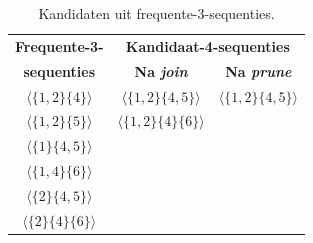\begin{table}
\centering
\caption{Kandidaten uit frequente-3-sequenties.}
\label{tabel:candidates-3-sequences}
\begin{tabular}{c|c|c}
\textbf{Frequente-3-}& \multicolumn{2}{c}{\textbf{Kandidaat-4-sequenties}} \\
\textbf{sequenties} & \textbf{Na \emph{join}} & \textbf{Na \emph{prune}} \\
$ \langle \{1,2\}\{4\}\rangle $ & $ \langle \{1,2\}\{4,5\}\rangle $ & $\langle \{1,2\}\{4,5\}\rangle $ \\ 
$ \langle \{1,2\}\{5\}\rangle $ & $ \langle \{1,2\}\{4\}\{6\}\rangle $ & \\ 
$ \langle \{1\}\{4,5\}\rangle $ &  & \\ 
$ \langle \{1,4\}\{6\}\rangle $ &  & \\ 
$ \langle \{2\}\{4,5\}\rangle $ &  & \\ 
$\langle\{2\}\{4\}\{6\}\rangle$ &  & \\ 


\end{tabular}
\end{table}